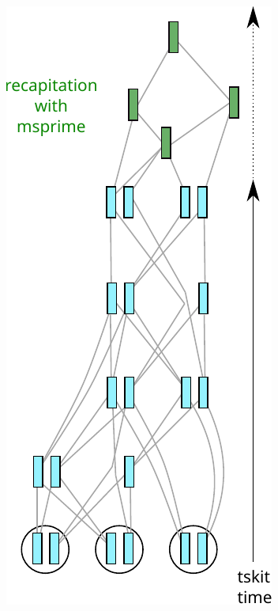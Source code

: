 \documentclass[12pt]{article}
\begin{document}
\begin{figure}
\centering
    \includegraphics{figures/pedigree_recapitate}

\end{figure}
\end{document}
